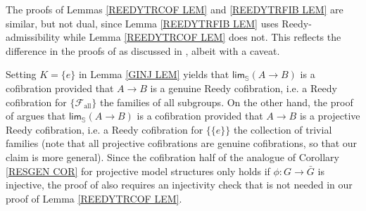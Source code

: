 \documentclass[a4paper,10pt
 ,draft
]{article}%
\begin{document}

\begin{remark}\label{NOTDUAL REM}
The proofs of Lemmas \ref{REEDYTRCOF LEM} and \ref{REEDYTRFIB LEM}
are similar, but not dual, since
Lemma \ref{REEDYTRFIB LEM} uses Reedy-admissibility 
while Lemma \ref{REEDYTRCOF LEM} does not.
This reflects the difference in the proofs of 
\cite[Lemmas 5.3 and 5.5]{BM11} as discussed in 
\cite[Remark 5.6]{BM11}, albeit with a caveat.

Setting $K=\{e\}$ in Lemma \ref{GINJ LEM} yields that
$\mathsf{lim}_{\mathbb{S}} (A \to B)$ is a cofibration provided that $A \to B$ is a genuine Reedy cofibration, i.e. a Reedy cofibration for $\{\mathcal{F}_{\text{all}}\}$ the families of all subgroups. 
On the other hand, the proof of \cite[Lemma 5.3]{BM11} argues that 
$\mathsf{lim}_{\mathbb{S}} (A \to B)$ is a cofibration provided that $A \to B$ is a projective Reedy cofibration, i.e. a Reedy cofibration for $\{\{e\}\}$ the collection of trivial families 
(note that all projective cofibrations are genuine cofibrations, so that our claim is more general).
Since the cofibration half of the 
analogue of Corollary \ref{RESGEN COR}
for projective model structures only holds if 
$\phi \colon G \to \bar{G}$ is injective, 
the proof of \cite[Lemma 5.3]{BM11} also requires an injectivity check that is not needed in our proof of Lemma \ref{REEDYTRCOF LEM}.
\end{remark}
\end{document}

